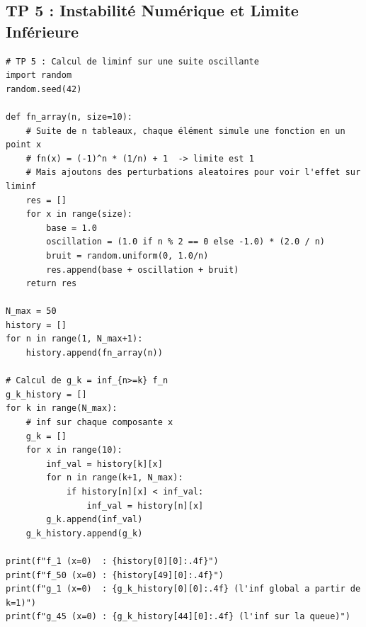 \documentclass[11pt,a4paper]{article}
\begin{document}
\subsection*{TP 5 : Instabilité Numérique et Limite Inférieure}
\begin{lstlisting}
# TP 5 : Calcul de liminf sur une suite oscillante
import random
random.seed(42)

def fn_array(n, size=10):
    # Suite de n tableaux, chaque élément simule une fonction en un point x
    # fn(x) = (-1)^n * (1/n) + 1  -> limite est 1
    # Mais ajoutons des perturbations aleatoires pour voir l'effet sur liminf
    res = []
    for x in range(size):
        base = 1.0
        oscillation = (1.0 if n % 2 == 0 else -1.0) * (2.0 / n)
        bruit = random.uniform(0, 1.0/n)
        res.append(base + oscillation + bruit)
    return res

N_max = 50
history = []
for n in range(1, N_max+1):
    history.append(fn_array(n))

# Calcul de g_k = inf_{n>=k} f_n
g_k_history = []
for k in range(N_max):
    # inf sur chaque composante x
    g_k = []
    for x in range(10):
        inf_val = history[k][x]
        for n in range(k+1, N_max):
            if history[n][x] < inf_val:
                inf_val = history[n][x]
        g_k.append(inf_val)
    g_k_history.append(g_k)

print(f"f_1 (x=0)  : {history[0][0]:.4f}")
print(f"f_50 (x=0) : {history[49][0]:.4f}")
print(f"g_1 (x=0)  : {g_k_history[0][0]:.4f} (l'inf global a partir de k=1)")
print(f"g_45 (x=0) : {g_k_history[44][0]:.4f} (l'inf sur la queue)")
\end{lstlisting}
\end{document}
